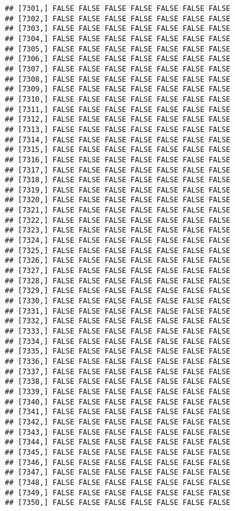 \documentclass[
]{article}
\begin{document}
\begin{verbatim}
## [7301,] FALSE FALSE FALSE FALSE FALSE FALSE FALSE
## [7302,] FALSE FALSE FALSE FALSE FALSE FALSE FALSE
## [7303,] FALSE FALSE FALSE FALSE FALSE FALSE FALSE
## [7304,] FALSE FALSE FALSE FALSE FALSE FALSE FALSE
## [7305,] FALSE FALSE FALSE FALSE FALSE FALSE FALSE
## [7306,] FALSE FALSE FALSE FALSE FALSE FALSE FALSE
## [7307,] FALSE FALSE FALSE FALSE FALSE FALSE FALSE
## [7308,] FALSE FALSE FALSE FALSE FALSE FALSE FALSE
## [7309,] FALSE FALSE FALSE FALSE FALSE FALSE FALSE
## [7310,] FALSE FALSE FALSE FALSE FALSE FALSE FALSE
## [7311,] FALSE FALSE FALSE FALSE FALSE FALSE FALSE
## [7312,] FALSE FALSE FALSE FALSE FALSE FALSE FALSE
## [7313,] FALSE FALSE FALSE FALSE FALSE FALSE FALSE
## [7314,] FALSE FALSE FALSE FALSE FALSE FALSE FALSE
## [7315,] FALSE FALSE FALSE FALSE FALSE FALSE FALSE
## [7316,] FALSE FALSE FALSE FALSE FALSE FALSE FALSE
## [7317,] FALSE FALSE FALSE FALSE FALSE FALSE FALSE
## [7318,] FALSE FALSE FALSE FALSE FALSE FALSE FALSE
## [7319,] FALSE FALSE FALSE FALSE FALSE FALSE FALSE
## [7320,] FALSE FALSE FALSE FALSE FALSE FALSE FALSE
## [7321,] FALSE FALSE FALSE FALSE FALSE FALSE FALSE
## [7322,] FALSE FALSE FALSE FALSE FALSE FALSE FALSE
## [7323,] FALSE FALSE FALSE FALSE FALSE FALSE FALSE
## [7324,] FALSE FALSE FALSE FALSE FALSE FALSE FALSE
## [7325,] FALSE FALSE FALSE FALSE FALSE FALSE FALSE
## [7326,] FALSE FALSE FALSE FALSE FALSE FALSE FALSE
## [7327,] FALSE FALSE FALSE FALSE FALSE FALSE FALSE
## [7328,] FALSE FALSE FALSE FALSE FALSE FALSE FALSE
## [7329,] FALSE FALSE FALSE FALSE FALSE FALSE FALSE
## [7330,] FALSE FALSE FALSE FALSE FALSE FALSE FALSE
## [7331,] FALSE FALSE FALSE FALSE FALSE FALSE FALSE
## [7332,] FALSE FALSE FALSE FALSE FALSE FALSE FALSE
## [7333,] FALSE FALSE FALSE FALSE FALSE FALSE FALSE
## [7334,] FALSE FALSE FALSE FALSE FALSE FALSE FALSE
## [7335,] FALSE FALSE FALSE FALSE FALSE FALSE FALSE
## [7336,] FALSE FALSE FALSE FALSE FALSE FALSE FALSE
## [7337,] FALSE FALSE FALSE FALSE FALSE FALSE FALSE
## [7338,] FALSE FALSE FALSE FALSE FALSE FALSE FALSE
## [7339,] FALSE FALSE FALSE FALSE FALSE FALSE FALSE
## [7340,] FALSE FALSE FALSE FALSE FALSE FALSE FALSE
## [7341,] FALSE FALSE FALSE FALSE FALSE FALSE FALSE
## [7342,] FALSE FALSE FALSE FALSE FALSE FALSE FALSE
## [7343,] FALSE FALSE FALSE FALSE FALSE FALSE FALSE
## [7344,] FALSE FALSE FALSE FALSE FALSE FALSE FALSE
## [7345,] FALSE FALSE FALSE FALSE FALSE FALSE FALSE
## [7346,] FALSE FALSE FALSE FALSE FALSE FALSE FALSE
## [7347,] FALSE FALSE FALSE FALSE FALSE FALSE FALSE
## [7348,] FALSE FALSE FALSE FALSE FALSE FALSE FALSE
## [7349,] FALSE FALSE FALSE FALSE FALSE FALSE FALSE
## [7350,] FALSE FALSE FALSE FALSE FALSE FALSE FALSE

\end{verbatim}
\end{document}
